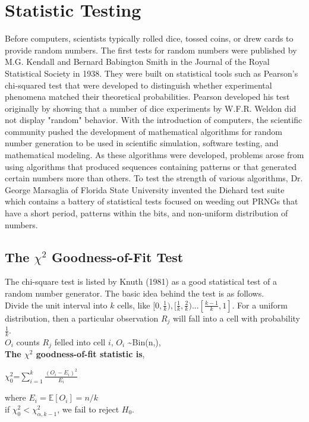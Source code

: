 \documentclass[a4paper,11pt]{article}
\begin{document}
\section{Statistic Testing} 
{Before computers, scientists typically rolled dice, tossed coins, or drew cards to provide random numbers. The first tests for random numbers were published by M.G. Kendall and Bernard Babington Smith in the Journal of the Royal Statistical Society in 1938. They were built on statistical tools such as Pearson's chi-squared test that were developed to distinguish whether experimental phenomena matched their theoretical probabilities. Pearson developed his test originally by showing that a number of dice experiments by W.F.R. Weldon did not display "random" behavior. With the introduction of computers, the scientific community pushed the development of mathematical algorithms for random number generation to be used in scientific simulation, software testing, and mathematical modeling. As these algorithms were developed, problems arose from using algorithms that produced sequences containing patterns or that generated certain numbers more than others. To test the strength of various algorithms, Dr. George Marsaglia of Florida State University invented the Diehard test suite which contains a battery of statistical tests focused on weeding out PRNGs that have a short period, patterns within the bits, and non-uniform distribution of numbers. \\

\subsection{The $\chi^2$ Goodness-of-Fit Test}
{
The chi-square test is listed by Knuth (1981) as a good statistical test of a random number generator. The basic idea behind the test is as follows.\\
Divide the unit interval into $k$ cells, like $[0,\frac{1}{k}),[\frac{1}{k},\frac{2}{k})...[\frac{k-1}{k},1]$. For a uniform distribution, then a particular observation 
$R_j$ will fall into a cell with probability $ \frac{1}{k}$.\\
$O_i$ counts $R_j$ felled into cell $i$, $O_i$ \sim Bin(n,), \\
\smallskip
\textbf{The $\chi^2$ goodness-of-fit statistic is},\\
\begin{center}
$\chi_0^2$=$\sum_{i=1}^k \frac{(O_i-E_i)^2}{E_i}$\\
\end{center}
where $E_i=\mathbb{E}[O_i]=n/k$\\
\smallskip
if $\chi_0^2<\chi_{\alpha,k-1}^2$, we fail to reject $H_0$.\\}
}
\end{document}
